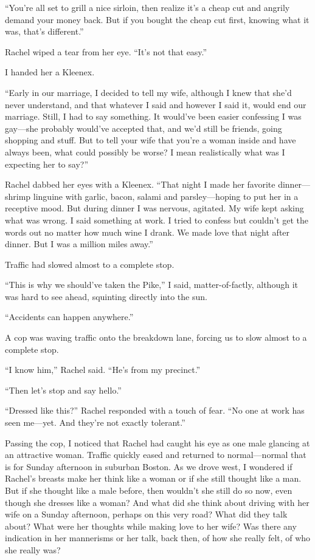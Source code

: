 ``You're all set to grill a nice sirloin, then realize it's a cheap cut
and angrily demand your money back. But if you bought the cheap cut
first, knowing what it was, that's different.''

Rachel wiped a tear from her eye. ``It's not that easy.''

I handed her a Kleenex.

``Early in our marriage, I decided to tell my wife, although I knew that
she'd never understand, and that whatever I said and however I said it,
would end our marriage. Still, I had to say something. It would've been
easier confessing I was gay---she probably would've accepted that, and
we'd still be friends, going shopping and stuff. But to tell your wife
that you're a woman inside and have always been, what could possibly be
worse? I mean realistically what was I expecting her to say?''

Rachel dabbed her eyes with a Kleenex. ``That night I made her favorite
dinner---shrimp linguine with garlic, bacon, salami and pars\-ley---hoping
to put her in a receptive mood. But during dinner I was nervous,
agitated. My wife kept asking what was wrong. I said something at work.
I tried to confess but couldn't get the words out no matter how much
wine I drank. We made love that night after dinner. But I was a million
miles away.''

Traffic had slowed almost to a complete stop.

``This is why we should've taken the Pike,'' I said, matter-of-factly,
although it was hard to see ahead, squinting directly into the sun.

``Accidents can happen anywhere.''

A cop was waving traffic onto the breakdown lane, forcing us to slow
almost to a complete stop.

``I know him,'' Rachel said. ``He's from my precinct.''

``Then let's stop and say hello.''

``Dressed like this?'' Rachel responded with a touch of fear. ``No one
at work has seen me---yet. And they're not exactly tolerant.''

Passing the cop, I noticed that Rachel had caught his eye as one male
glancing at an attractive woman. Traffic quickly eased and returned to
normal---normal that is for Sunday afternoon in suburban Boston. As we
drove west, I wondered if Rachel's breasts make her think like a woman
or if she still thought like a man. But if she thought like a male
before, then wouldn't she still do so now, even though she dresses like
a woman? And what did she think about driving with her wife on a Sunday
afternoon, perhaps on this very road? What did they talk about? What
were her thoughts while making love to her wife? Was there any
indication in her mannerisms or her talk, back then, of how she really
felt, of who she really was?

